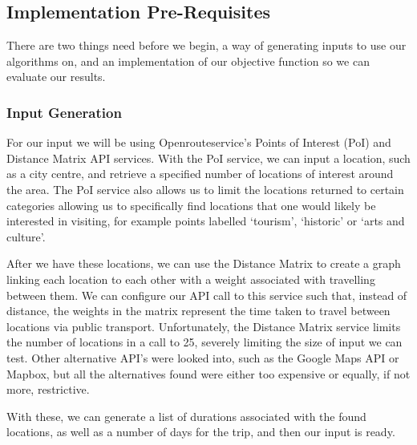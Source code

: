 
\subsection{Implementation Pre-Requisites}\label{subsec:implementation-pre-requisites}
There are two things need before we begin, a way of generating inputs to use our algorithms on, and an
implementation of our objective function so we can evaluate our results.

\subsubsection{Input Generation}\label{subsubsec:input-generation}
For our input we will be using Openrouteservice's Points of Interest (PoI) and Distance Matrix API services.
With the PoI service, we can input a location, such as a city centre, and retrieve a specified number of locations
of interest around the area.
The PoI service also allows us to limit the locations returned to certain categories allowing us to specifically find
locations that one would likely be interested in visiting, for example points labelled `tourism', `historic' or
`arts and culture'.

After we have these locations, we can use the Distance Matrix to create a graph linking each location to each other
with a weight associated with travelling between them.
We can configure our API call to this service such that, instead of distance, the weights in the matrix represent
the time taken to travel between locations via public transport.
Unfortunately, the Distance Matrix service limits the number of locations in a call to 25, severely limiting the
size of input we can test.
Other alternative API's were looked into, such as the Google Maps API or Mapbox, but all the alternatives found were
either too expensive or equally, if not more, restrictive.

With these, we can generate a list of durations associated with the found locations, as well as a number of days for
the trip, and then our input is ready.

